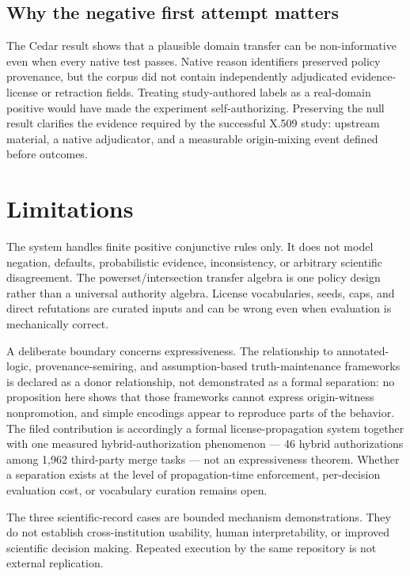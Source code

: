 \documentclass[pdflatex,sn-mathphys-num]{sn-jnl}
\begin{document}
\subsection{Why the negative first attempt matters}\label{why-the-negative-first-attempt-matters}

The Cedar result shows that a plausible domain transfer can be non-informative even when every native test passes. Native reason identifiers preserved policy provenance, but the corpus did not contain independently adjudicated evidence-license or retraction fields. Treating study-authored labels as a real-domain positive would have made the experiment self-authorizing. Preserving the null result clarifies the evidence required by the successful X.509 study: upstream material, a native adjudicator, and a measurable origin-mixing event defined before outcomes.

\section{Limitations}\label{limitations}

The system handles finite positive conjunctive rules only. It does not model negation, defaults, probabilistic evidence, inconsistency, or arbitrary scientific disagreement. The powerset/intersection transfer algebra is one policy design rather than a universal authority algebra. License vocabularies, seeds, caps, and direct refutations are curated inputs and can be wrong even when evaluation is mechanically correct.

A deliberate boundary concerns expressiveness. The relationship to annotated-logic, provenance-semiring, and assumption-based truth-maintenance frameworks is declared as a donor relationship, not demonstrated as a formal separation: no proposition here shows that those frameworks cannot express origin-witness nonpromotion, and simple encodings appear to reproduce parts of the behavior. The filed contribution is accordingly a formal license-propagation system together with one measured hybrid-authorization phenomenon --- 46 hybrid authorizations among 1,962 third-party merge tasks --- not an expressiveness theorem. Whether a separation exists at the level of propagation-time enforcement, per-decision evaluation cost, or vocabulary curation remains open.

The three scientific-record cases are bounded mechanism demonstrations. They do not establish cross-institution usability, human interpretability, or improved scientific decision making. Repeated execution by the same repository is not external replication.
\end{document}
